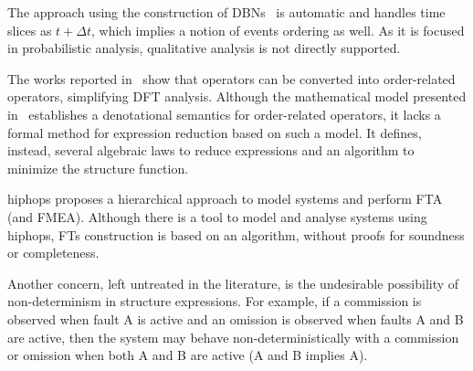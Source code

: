 The approach using the construction of \acp{DBN}~\cite{BRM+2005} is automatic and handles time slices as $t + \Delta t$, which implies a notion of events ordering as well.
As it is focused in probabilistic analysis, qualitative analysis is not directly supported.

The works reported in~\cite{Merle2010,XTD2012} show that  operators can be converted into order-related operators, simplifying \ac{DFT} analysis.
Although the mathematical model presented in~\cite{Merle2010} establishes a denotational semantics for order-related operators, it lacks a formal method for expression reduction based on such a model.
It defines, instead, several algebraic laws to reduce expressions and an algorithm to minimize the structure function.

\begin{sloppypar}
\Ac{hiphops} proposes a hierarchical approach to model systems and perform \ac{FTA} (and \ac{FMEA}).
Although there is a tool to model and analyse systems using \ac{hiphops}, \acp{FT} construction is based on an algorithm, without proofs for soundness or completeness.
\end{sloppypar}


\begin{sloppypar}
Another concern, left untreated in the literature, is the undesirable possibility of non-determinism in structure expressions.
For example, if a commission is observed when fault A is active and an omission is observed when faults A and B are active, then the system may behave non-deterministically with a commission or omission when both A and B are active (A and B implies A).
\end{sloppypar}

